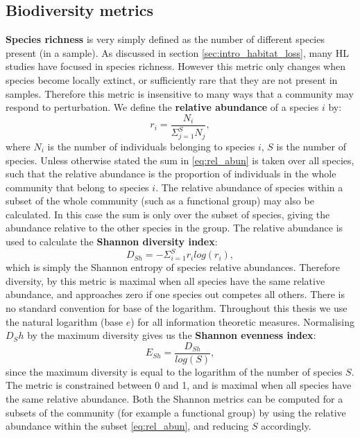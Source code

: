 \subsection{Biodiversity metrics}
\label{sec:define_dviersity}

\textbf{Species richness} is very simply defined as the number of different species present (in a sample). As discussed in section \ref{sec:intro_habitat_loss}, many HL studies have focused in species richness. However this metric only changes when species become locally extinct, or sufficiently rare that they are not present in samples. Therefore this metric is insensitive to many ways that a community may respond to perturbation. We define the \textbf{relative abundance} of a species $i$ by:
\begin{equation}
r_i = \frac{N_i}{\Sigma_{j=1}^S N_j},
\label{eq:rel_abun}
\end{equation}
%
where $N_i$ is the number of individuals belonging to species $i$, $S$ is the number of species. Unless otherwise stated the sum in \eqref{eq:rel_abun} is taken over all species, such that the relative abundance is the proportion of individuals in the whole community that belong to species $i$. The relative abundance of species within a subset of the whole community (such as a functional group) may also be calculated. In this case the sum is only over the subset of species, giving the abundance relative to the other species in the group. The relative abundance is used to calculate the \textbf{Shannon diversity index}:
\begin{equation}
D_{Sh} = -\Sigma_{i=1}^S r_i log( r_i),
\label{eq:rel_abun}
\end{equation}
%
which is simply the Shannon entropy of species relative abundances. Therefore diversity, by this metric is maximal when all species have the same relative abundance, and approaches zero if one species out competes all others. There is no standard convention for base of the logarithm. Throughout this thesis we use the natural logarithm (base $e$) for all information theoretic measures. Normalising $D_Sh$ by the maximum diversity gives us the \textbf{Shannon evenness index}:
\begin{equation}
E_{Sh} = \frac{D_{Sh}}{log(S)},
\label{eq:rel_abun}
\end{equation}
%
since the maximum diversity is equal to the logarithm of the number of species $S$. The metric is constrained between 0 and 1, and is maximal when all species have the same relative abundance. Both the Shannon metrics can be computed for a subsets of the community (for example a functional group) by using the relative abundance within the subset \eqref{eq:rel_abun}, and reducing $S$ accordingly. 

